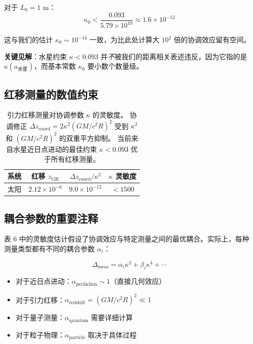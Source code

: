 \documentclass[11pt,a4paper]{article}
\begin{document}
	对于 $L_0 = 1$ m：
	\begin{equation}
		\kappa_0 < \frac{0.093}{5.79 \times 10^{10}} \approx 1.6 \times 10^{-12}
	\end{equation}
	
	这与我们的估计 $\kappa_0 \sim 10^{-14}$ 一致，为比此处计算大 $10^2$ 倍的协调效应留有空间。
	
	\textbf{关键见解}：水星约束 $\kappa < 0.093$ 并\textit{不}被我们的距离相关表述违反，因为它指的是 $\kappa(a_{\text{水星}})$，而基本常数 $\kappa_0$ 要小数个数量级。
	
	\subsection{红移测量的数值约束}
	
	\begin{table}[htbp]
		\centering
		\begin{tabular}{lccc}
			\toprule
			\textbf{系统} & \textbf{红移 $z_{\text{GR}}$} & \textbf{$\Delta z_{\text{coord}}/\kappa^2$} & \textbf{$\kappa$ 灵敏度} \\
			\midrule
			太阳 & $2.12\times10^{-6}$ & $9.0\times10^{-12}$ & $<1500$ \\
		\end{tabular}
		\caption{引力红移测量对协调参数 $\kappa$ 的灵敏度。
			协调修正 $\Delta z_{\text{coord}} = 2\kappa^2 (GM/c^2R)^2$ 受到 $\kappa^2$ 和 $(GM/c^2R)^2$ 的双重平方抑制。
			当前来自水星近日点进动的最佳约束 $\kappa < 0.093$ 优于所有红移测量。}
	\end{table}
	
	\subsection{耦合参数的重要注释}
	
	表 6 中的灵敏度估计假设了协调效应与特定测量之间的最优耦合。实际上，每种测量类型都有不同的耦合参数 $\alpha_i$：
	
	\begin{equation}
		\Delta_{\text{meas}} = \alpha_i \kappa^2 + \beta_i \kappa^4 + \cdots
	\end{equation}
	
	\begin{itemize}
		\item 对于近日点进动：$\alpha_{\text{perihelion}} \sim 1$（直接几何效应）
		\item 对于引力红移：$\alpha_{\text{redshift}} = (GM/c^2R)^2 \ll 1$
		\item 对于量子测量：$\alpha_{\text{quantum}}$ 需要详细计算
		\item 对于粒子物理：$\alpha_{\text{particle}}$ 取决于具体过程
	\end{itemize}
	
\end{document}
